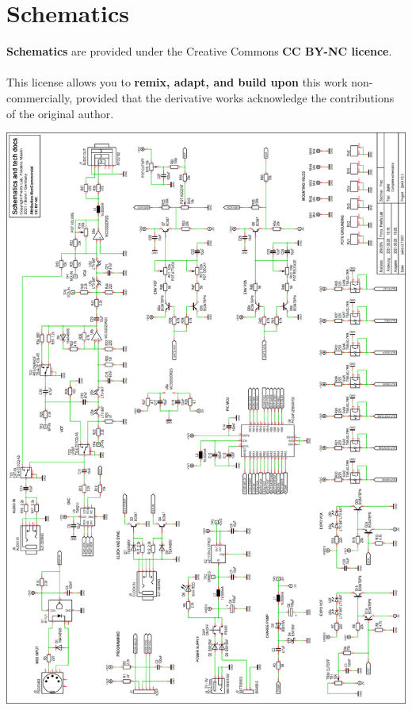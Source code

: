 \documentclass{scrartcl}
\begin{document}
\section{Schematics}
\textbf{Schematics} are provided under the Creative Commons \textbf{CC BY-NC licence}.\\\\
This license allows you to \textbf{remix, adapt, and build upon} this work non-commercially, provided that the derivative works acknowledge the contributions of the original author.
\vspace{0.25cm}
\begin{center}
    \includegraphics[scale=0.72,origin=c]{assets/schema-full.png}
\end{center}
\end{document}
